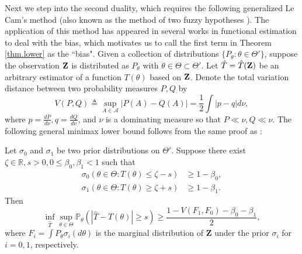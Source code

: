 \documentclass[final,12pt]{colt2018} %
\def \bP {\mathbb{P}}
\def \bE {\mathbb{E}}
\begin{document}
Next we step into the second duality, which requires the following generalized Le Cam's method (also known as the method of two fuzzy hypotheses \cite{Tsybakov2008}). The application of this method has appeared in several works in functional estimation \cite{Lepski--Nemirovski--Spokoiny1999estimation,Cai--Low2011,Jiao--Venkat--Han--Weissman2015minimax,wu2016minimax,Han--Jiao--Weissman2016minimaxdivergence,jiao2017minimax,Han--Jiao--Mukherjee--Weissman2017adaptive,han-jiao-weissman-wu2017minimax} to deal with the bias, which motivates us to call the first term in Theorem \ref{thm.lower} as the ``bias". Given a collection of distributions $\{P_\theta: \theta\in\Theta'\}$, suppose the observation ${\bf Z}$ is distributed as $P_\theta$ with $\theta \in \Theta\subset \Theta'$. 
Let $\hat{T} = \hat{T}({\bf Z})$ be an arbitrary estimator of a function $T(\theta)$ based on $\bf Z$. Denote the total variation distance between two probability measures $P,Q$ by 
\begin{equation*}
V(P,Q) \triangleq \sup_{A\in \mathcal{A}} | P(A) - Q(A) | = \frac{1}{2} \int |p-q| d\nu,
\end{equation*}
where $p = \frac{dP}{d\nu}, q = \frac{dQ}{d\nu}$, and $\nu$ is a dominating measure so that $P \ll \nu, Q \ll \nu$.
The following general minimax lower bound follows from the same proof as \cite[Theorem 2.15]{Tsybakov2008}:
\begin{lemma}\label{lemma.tsybakov}
	Let $\sigma_0$ and $\sigma_1$ be two prior distributions on $\Theta'$.
	Suppose there exist $\zeta\in \mathbb{R}, s>0, 0\leq \beta_0,\beta_1 <1$ such that
	\begin{align*}
	\sigma_0(\theta \in \Theta: T(\theta) \leq \zeta -s) & \geq 1-\beta_0, \\
	\sigma_1(\theta \in \Theta: T(\theta) \geq \zeta + s) & \geq 1-\beta_1.
	\end{align*}
	Then
	\begin{equation*}
	\inf_{\hat{T}} \sup_{\theta \in \Theta} \bP_\theta\left( |\hat{T} - T(\theta)| \geq s \right) \geq \frac{1-V(F_1,F_0)  - \beta_0 - \beta_1}{2},
	\end{equation*}
	where 
	$F_i=\int P_\theta \sigma_i(d \theta)$ is the marginal distribution of $\mathbf{Z}$ under the prior $\sigma_i$ for $i = 0,1$, respectively.
\end{lemma}
\end{document}
